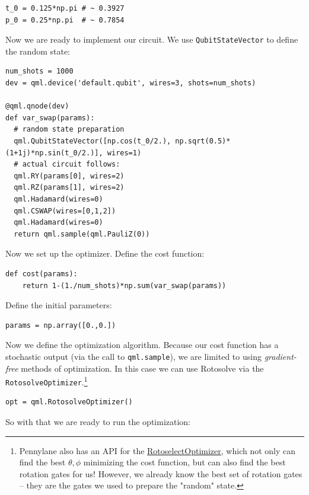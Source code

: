 \documentclass[11pt]{article}
\begin{document}
\begin{verbatim}
t_0 = 0.125*np.pi # ~ 0.3927
p_0 = 0.25*np.pi  # ~ 0.7854
\end{verbatim}

Now we are ready to implement our circuit. We use \texttt{QubitStateVector} to define the random state: 

\begin{verbatim}
num_shots = 1000
dev = qml.device('default.qubit', wires=3, shots=num_shots)

@qml.qnode(dev)
def var_swap(params):
  # random state preparation
  qml.QubitStateVector([np.cos(t_0/2.), np.sqrt(0.5)*(1+1j)*np.sin(t_0/2.)], wires=1)
  # actual circuit follows:
  qml.RY(params[0], wires=2)
  qml.RZ(params[1], wires=2)
  qml.Hadamard(wires=0)
  qml.CSWAP(wires=[0,1,2])
  qml.Hadamard(wires=0)
  return qml.sample(qml.PauliZ(0))
\end{verbatim}


Now we set up the optimizer.
Define the cost function:

\begin{verbatim}
def cost(params):
    return 1-(1./num_shots)*np.sum(var_swap(params))
\end{verbatim}

Define the initial parameters:

\begin{verbatim}
params = np.array([0.,0.])
\end{verbatim}

Now we define the optimization algorithm.
Because our cost function has a stochastic output (via the call to \texttt{qml.sample}), we are limited to using \emph{gradient-free} methods of optimization.
In this case we can use Rotosolve via the \texttt{RotosolveOptimizer}.\footnote{Pennylane also has an API for the \href{https://pennylane.readthedocs.io/en/stable/code/api/pennylane.RotoselectOptimizer.html}{RotoselectOptimizer}, which not only can find the best \(\theta, \phi\) minimizing the cost function, but can also find the best rotation gates for us! However, we already know the best set of rotation gates -- they are the gates we used to prepare the "random" state.}

\begin{verbatim}
opt = qml.RotosolveOptimizer()

\end{verbatim}

So with that we are ready to run the optimization:
\end{document}
